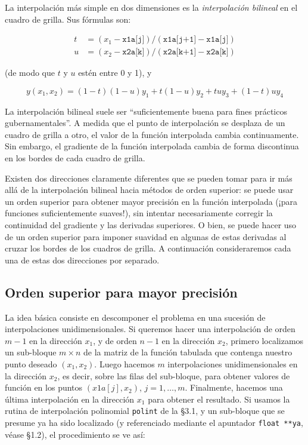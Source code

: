 \documentclass[10pt,a4paper]{book}
\begin{document}
La interpolación más simple en dos dimensiones es la \textit{interpolación bilineal} en el cuadro de grilla. Sus fórmulas son:

\begin{align}
t &= (x_1 - \texttt{x1a[j]}) / (\texttt{x1a[j+1]} - \texttt{x1a[j]}) \\
u &= (x_2 - \texttt{x2a[k]}) / (\texttt{x2a[k+1]} - \texttt{x2a[k]})
\end{align}

(de modo que \( t \) y \( u \) estén entre 0 y 1), y

\begin{equation}
y(x_1, x_2) = (1 - t)(1 - u)y_1 + t(1 - u)y_2 + tu y_3 + (1 - t)u y_4
\end{equation}

La interpolación bilineal suele ser “suficientemente buena para fines prácticos gubernamentales”. A medida que el punto de interpolación se desplaza de un cuadro de grilla a otro, el valor de la función interpolada cambia continuamente. Sin embargo, el gradiente de la función interpolada cambia de forma discontinua en los bordes de cada cuadro de grilla.

Existen dos direcciones claramente diferentes que se pueden tomar para ir más allá de la interpolación bilineal hacia métodos de orden superior: se puede usar un orden superior para obtener mayor precisión en la función interpolada (¡para funciones suficientemente suaves!), sin intentar necesariamente corregir la continuidad del gradiente y las derivadas superiores. O bien, se puede hacer uso de un orden superior para imponer suavidad en algunas de estas derivadas al cruzar los bordes de los cuadros de grilla. A continuación consideraremos cada una de estas dos direcciones por separado.

\subsection{Orden superior para mayor precisión}

La idea básica consiste en descomponer el problema en una sucesión de interpolaciones unidimensionales. Si queremos hacer una interpolación de orden \( m-1 \) en la dirección \( x_1 \), y de orden \( n-1 \) en la dirección \( x_2 \), primero localizamos un sub-bloque \( m \times n \) de la matriz de la función tabulada que contenga nuestro punto deseado \( (x_1, x_2) \). Luego hacemos \( m \) interpolaciones unidimensionales en la dirección \( x_2 \), es decir, sobre las filas del sub-bloque, para obtener valores de función en los puntos \( (x1a[j], x_2) \), \( j = 1, \ldots, m \). Finalmente, hacemos una última interpolación en la dirección \( x_1 \) para obtener el resultado. Si usamos la rutina de interpolación polinomial \texttt{polint} de la §3.1, y un sub-bloque que se presume ya ha sido localizado (y referenciado mediante el apuntador \texttt{float **ya}, véase §1.2), el procedimiento se ve así:
\end{document}
